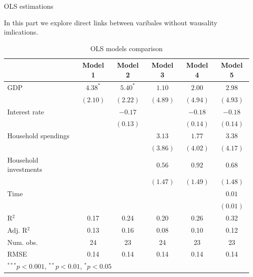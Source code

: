 \documentclass[11pt,ignorenonframetext,]{beamer}
\begin{document}
\begin{frame}{OLS estimations}
\protect\hypertarget{ols-estimations}{}

In this part we explore direct links between varibales without wausality
imlications.

\FloatBarrier

\tiny

\begin{table}[!htbp]
\begin{center}
\begin{tabular}{l c c c c c }
\hline
 & Model 1 & Model 2 & Model 3 & Model 4 & Model 5 \\
\hline
GDP                   & $4.38^{*}$ & $5.40^{*}$ & $1.10$   & $2.00$   & $2.98$   \\
                      & $(2.10)$   & $(2.22)$   & $(4.89)$ & $(4.94)$ & $(4.93)$ \\
Interest rate         &            & $-0.17$    &          & $-0.18$  & $-0.18$  \\
                      &            & $(0.13)$   &          & $(0.14)$ & $(0.14)$ \\
Household spendings   &            &            & $3.13$   & $1.77$   & $3.38$   \\
                      &            &            & $(3.86)$ & $(4.02)$ & $(4.17)$ \\
Household investments &            &            & $0.56$   & $0.92$   & $0.68$   \\
                      &            &            & $(1.47)$ & $(1.49)$ & $(1.48)$ \\
Time                  &            &            &          &          & $0.01$   \\
                      &            &            &          &          & $(0.01)$ \\
\hline
R$^2$                 & 0.17       & 0.24       & 0.20     & 0.26     & 0.32     \\
Adj. R$^2$            & 0.13       & 0.16       & 0.08     & 0.10     & 0.12     \\
Num. obs.             & 24         & 23         & 24       & 23       & 23       \\
RMSE                  & 0.14       & 0.14       & 0.14     & 0.14     & 0.14     \\
\hline
\multicolumn{6}{l}{\scriptsize{$^{***}p<0.001$, $^{**}p<0.01$, $^*p<0.05$}}
\end{tabular}
\caption{OLS models comparison}
\label{table:coefficients}
\end{center}
\end{table}

\normalsize

\FloatBarrier

\end{frame}
\end{document}
